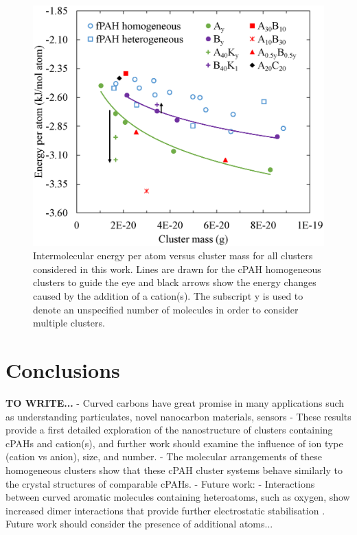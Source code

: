 %
\begin{figure}[!tbh]
\centering
\includegraphics[width=0.5\linewidth]{Figures/energies.eps}
\caption{Intermolecular energy per atom versus cluster mass for all clusters considered in this work. Lines are drawn for the cPAH homogeneous clusters to guide the eye and black arrows show the energy changes caused by the addition of a cation(s). The subscript y is used to denote an unspecified number of molecules in order to consider multiple clusters.}
\label{fig:energies}
\end{figure}
%

%

\section{Conclusions}
\textbf{TO WRITE...}
- Curved carbons have great promise in many applications such as understanding particulates, novel nanocarbon materials, sensors
- These results provide a first detailed exploration of the nanostructure of clusters containing cPAHs and cation(s), and further work should examine the influence of ion type (cation vs anion), size, and number.
- The molecular arrangements of these homogeneous clusters show that these cPAH cluster systems behave similarly to the crystal structures of comparable cPAHs.
- Future work:
- Interactions between curved aromatic molecules containing heteroatoms, such as oxygen, show increased dimer interactions that provide further electrostatic stabilisation \cite{Cabaleiro-Lago2018}.  Future work should consider the presence of additional atoms...

